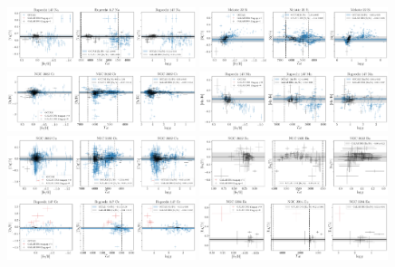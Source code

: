 \documentclass[fleqn,usenatbib,useAMS]{mnras}
\begin{document}
\begin{figure}
\centering
\includegraphics[width=0.49\textwidth]{figures/oc_Na_Ruprecht_147.png}
\includegraphics[width=0.49\textwidth]{figures/oc_Si_Melotte_22.png}
\includegraphics[width=0.49\textwidth]{figures/oc_Cr_NGC_2682.png}
\includegraphics[width=0.49\textwidth]{figures/oc_Mn_Ruprecht_147.png}
\includegraphics[width=0.49\textwidth]{figures/oc_Cu_NGC_2682.png}
\includegraphics[width=0.49\textwidth]{figures/oc_Ba_NGC_2632.png}
\includegraphics[width=0.49\textwidth]{figures/oc_Ce_Ruprecht_147.png}
\includegraphics[width=0.49\textwidth]{figures/oc_Eu_NGC_2204.png}

\end{figure}
\end{document}
